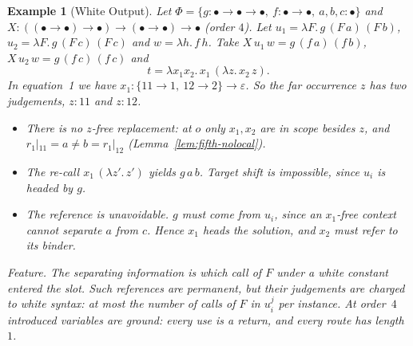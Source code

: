 \documentclass[10pt,a4paper]{article}
\theoremstyle{plain}%
\newtheorem{example}[theorem]{Example}
\begin{document}
\begin{example}[White Output]\label{ex:ex-white}
Let $\Phi = \{g : \bullet\to\bullet\to\bullet,\ f : \bullet\to\bullet,\ a,b,c : \bullet\}$ and $X : ((\bullet\to\bullet)\to\bullet) \to (\bullet\to\bullet) \to \bullet$ (order $4$).
Let $u_1 = \lambda F.\,g\,(F\,a)\,(F\,b)$, $u_2 = \lambda F.\,g\,(F\,c)\,(F\,c)$ and $w = \lambda h.\,f\,h$.
Take $X\,u_1\,w = g\,(f\,a)\,(f\,b)$, $X\,u_2\,w = g\,(f\,c)\,(f\,c)$ and
\[
t = \lambda x_1x_2.\,x_1\,(\lambda z.\,x_2\,z).
\]
In equation~1 we have $x_1 : \{11 \to 1,\ 12 \to 2\} \to \varepsilon$.
So the far occurrence $z$ has two judgements, $z : 11$ and $z : 12$.
\begin{itemize}
\item There is no $z$-free replacement: at $o$ only $x_1, x_2$ are in scope besides $z$, and $r_1|_{11} = a \neq b = r_1|_{12}$ (Lemma~\ref{lem:fifth-nolocal}).
\item The re-call $x_1\,(\lambda z'.\,z')$ yields $g\,a\,b$.
Target shift is impossible, since $u_i$ is headed by $g$.
\item The reference is unavoidable.
$g$ must come from $u_i$, since an $x_1$-free context cannot separate $a$ from $c$.
Hence $x_1$ heads the solution, and $x_2$ must refer to its binder.
\end{itemize}

\emph{Feature.}
The separating information is which call of $F$ under a white constant entered the slot.
Such references are permanent, but their judgements are charged to white syntax: at most the number of calls of $F$ in $u_i^j$ per instance.
At order~$4$ introduced variables are ground: every use is a return, and every route has length~$1$.
\end{example}
\end{document}
